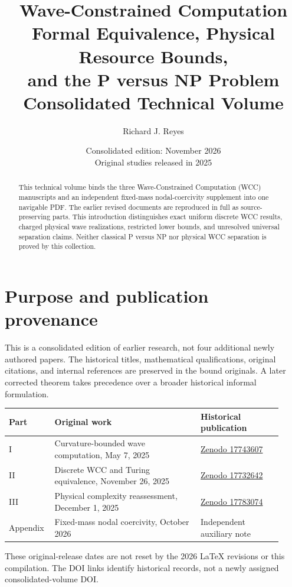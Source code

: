 \documentclass[11pt]{article}
\title{\bfseries Wave-Constrained Computation\\[0.4em]\large Formal Equivalence, Physical Resource Bounds,\\and the P versus NP Problem\\[0.8em]\normalsize Consolidated Technical Volume}
\author{Richard J. Reyes}
\date{Consolidated edition: November 2026\\\small Original studies released in 2025}
\begin{document}
\maketitle
\begin{abstract}
This technical volume binds the three Wave-Constrained Computation (WCC) manuscripts and an independent fixed-mass nodal-coercivity supplement into one navigable PDF. The earlier revised documents are reproduced in full as source-preserving parts. This introduction distinguishes exact uniform discrete WCC results, charged physical wave realizations, restricted lower bounds, and unresolved universal separation claims. Neither classical P versus NP nor physical WCC separation is proved by this collection.
\end{abstract}
\clearpage
\tableofcontents
\clearpage

\section{Purpose and publication provenance}
This is a consolidated edition of earlier research, not four additional newly authored papers. The historical titles, mathematical qualifications, original citations, and internal references are preserved in the bound originals. A later corrected theorem takes precedence over a broader historical informal formulation.

\begin{center}\small
\begin{tabular}{@{}p{0.13\linewidth}p{0.50\linewidth}p{0.29\linewidth}@{}}\toprule
Part & Original work & Historical publication\\\midrule
I & Curvature-bounded wave computation, May 7, 2025 & \href{https://doi.org/10.5281/zenodo.17743607}{Zenodo 17743607}\\
II & Discrete WCC and Turing equivalence, November 26, 2025 & \href{https://doi.org/10.5281/zenodo.17732642}{Zenodo 17732642}\\
III & Physical complexity reassessment, December 1, 2025 & \href{https://doi.org/10.5281/zenodo.17783074}{Zenodo 17783074}\\
Appendix & Fixed-mass nodal coercivity, October 2026 & Independent auxiliary note\\
\bottomrule
\end{tabular}
\end{center}
These original-release dates are not reset by the 2026 LaTeX revisions or this compilation. The DOI links identify historical records, not a newly assigned consolidated-volume DOI.
\end{document}
